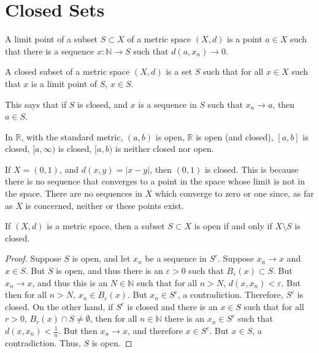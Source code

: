     \section{Closed Sets}
        \begin{definition}
            A limit point of a subset
            $S\subset{X}$ of a metric space
            $(X,d)$ is a point $a\in{X}$ such
            that there is a sequence
            $x:\mathbb{N}\rightarrow{S}$ such that
            $d(a,x_{n})\rightarrow{0}$.
        \end{definition}
        \begin{definition}
            A closed subset of a metric space $(X,d)$
            is a set $S$ such that for all $x\in{X}$ such
            that $x$ is a limit point of $S$, $x\in{S}$.
        \end{definition}
        This says that if $S$ is closed, and
        $x$ is a sequence in $S$ such
        that $x_{n}\rightarrow{a}$, then
        $a\in{S}$.
        \begin{example}
            In $\mathbb{R}$, with the standard
            metric, $(a,b)$ is open,
            $\mathbb{R}$ is open (and closed),
            $[a,b]$ is closed,
            $[a,\infty)$ is closed,
            $[a,b)$ is neither closed nor open.
        \end{example}
        \begin{example}
            If $X=(0,1)$, and
            $d(x,y)=|x-y|$, then
            $(0,1)$ is closed. This is because
            there is no sequence that converges
            to a point in the space whose limit
            is not in the space. There are no sequences
            in $X$ which converge to zero or one since,
            as far as $X$ is concerned,
            neither or these points exist.
        \end{example}
        \begin{theorem}
            If $(X,d)$ is a metric space,
            then a subset $S\subset{X}$ is open
            if and only if $X\setminus{S}$ is closed.
        \end{theorem}
        \begin{proof}
            Suppose $S$ is open, and let
            $x_{n}$ be a sequence in $S^{c}$.
            Suppose $x_{n}\rightarrow{x}$ and
            $x\in{S}$. But $S$ is open, and thus
            there is an $\varepsilon>0$ such that
            $B_{\varepsilon}(x)\subset{S}$.
            But $x_{n}\rightarrow{x}$, and thus
            this is an $N\in\mathbb{N}$ such that
            for all $n>N$, $d(x,x_{n})<\varepsilon$.
            But then for all $n>N$,
            $x_{n}\in{B_{\varepsilon}(x)}$. But
            $x_{n}\in{S^{c}}$, a contradiction.
            Therefore, $S^{c}$ is closed. On the
            other hand, if $S^{c}$ is closed
            and there is an $x\in{S}$ such that
            for all $r>0$,
            $B_{r}(x)\cap{S}\ne\emptyset$, then
            for all $n\in\mathbb{N}$ there is
            an $x_{n}\in{S^{c}}$ such that
            $d(x,x_{n})<\frac{1}{n}$. But then
            $x_{n}\rightarrow{x}$, and therefore
            $x\in{S^{c}}$. But $x\in{S}$,
            a contradiction. Thus, $S$ is open.
        \end{proof}
